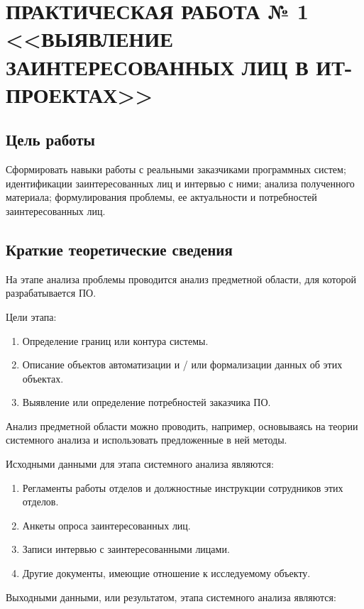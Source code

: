 \chapter {ПРАКТИЧЕСКАЯ РАБОТА № 1 <<ВЫЯВЛЕНИЕ ЗАИНТЕРЕСОВАННЫХ ЛИЦ В ИТ-ПРОЕКТАХ>>}

\section{Цель работы}

Сформировать навыки работы с реальными заказчиками программных систем; идентификации заинтересованных лиц и интервью с ними; анализа полученного материала; формулирования проблемы, ее актуальности и потребностей заинтересованных лиц.

\section{Краткие теоретические сведения}

На этапе анализа проблемы проводится анализ предметной области, для которой разрабатывается ПО.

Цели этапа:

\begin{enumerate}
	\item{Определение границ или контура системы.}
	\item{Описание объектов автоматизации и / или формализации данных об этих объектах.}
	\item{Выявление или определение потребностей заказчика ПО.}
\end{enumerate}

Анализ предметной области можно проводить, например, основываясь на теории системного анализа и использовать предложенные в ней методы.

Исходными данными для этапа системного анализа являются:

\begin{enumerate}
	\item{Регламенты работы отделов и должностные инструкции сотрудников этих отделов.}
	\item{Анкеты опроса заинтересованных лиц.}
	\item{Записи интервью с заинтересованными лицами.}
	\item{Другие документы, имеющие отношение к исследуемому объекту.}
\end{enumerate}

Выходными данными, или результатом, этапа системного анализа являются:

